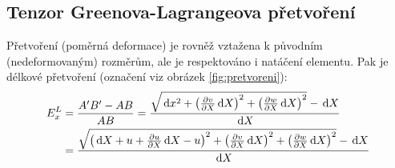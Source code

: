 
\subsection{Tenzor Greenova-Lagrangeova přetvoření}\label{sec:green-lagrange}
Přetvoření (poměrná deformace) je rovněž vztažena k původním (nedeformovaným) rozměrům, ale je respektováno i natáčení elementu. Pak je délkové přetvoření (označení viz obrázek \ref{fig:pretvoreni}):
\begin{equation}\begin{split}
	E^L_x &= \frac{A'B' - AB}{AB}
	= \frac{\sqrt{\,\mathrm{d} x^2 + \left( \frac{\partial v}{\partial X} \,\mathrm{d} X \right)^2 + \left( \frac{\partial w}{\partial X} \,\mathrm{d} X \right)^2} - \,\mathrm{d} X}{\,\mathrm{d} X}\\
	&= \frac{\sqrt{ \left( \,\mathrm{d} X + u + \frac{\partial u}{\partial X} \,\mathrm{d} X - u \right)^2 + \left( \frac{\partial v}{\partial X} \,\mathrm{d} X \right)^2 + \left( \frac{\partial w}{\partial X} \,\mathrm{d} X \right)^2} - \,\mathrm{d} X}{\,\mathrm{d} X}
\end{split}\end{equation}

